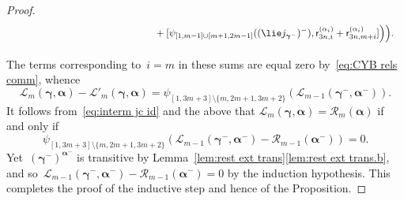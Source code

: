 \documentclass[12pt, reqno]{amsart}
\theoremstyle{definition}
\numberwithin{equation}{section}
\newcommand{\sr}[3]{\mathsf r_{#1,#2}^{(#3)}}
\begin{document}
\begin{proof}
\begin{align*}
&\phantom{=
\psi_{[1,3m+3]\setminus\{m,2m+1,3m+2\}}\Big(\sum_{1\le i\le m}}
+[\psi_{[1,m-1]\cup[m+1,2m-1]}((\lie j_{\boldsymbol\gamma^-})^-),\sr{3n}{i}{\alpha_i}+
\sr{3n}{m+i}{\alpha_i}]\Big)\Big).
\end{align*}
The terms corresponding to~$i=m$ in these sums are equal zero by~\eqref{eq:CYB rels comm}, whence 
$$
\mathscr L_m(\boldsymbol\gamma,\boldsymbol\alpha)-\mathscr L'_m(\boldsymbol\gamma,\boldsymbol\alpha)
=\psi_{[1,3m+3]\setminus\{m,2m+1,3m+2\}}(\mathscr L_{m-1}(\boldsymbol\gamma^-,\boldsymbol\alpha^-)).
$$
It follows from~\eqref{eq:interm jc id} and the above that $\mathscr L_m(\boldsymbol\gamma,\boldsymbol \alpha)=\mathscr R_m(\boldsymbol\alpha)$
if and only if 
$$
\psi_{[1,3m+3]\setminus\{m,2m+1,3m+2\}}(\mathscr L_{m-1}(\boldsymbol\gamma^-,\boldsymbol\alpha^-)-
\mathscr R_{m-1}(\boldsymbol{\alpha^-}))=0.
$$
Yet~$(\boldsymbol\gamma^-)^{\boldsymbol{\alpha}^-}$ is transitive by Lemma~\ref{lem:rest ext trans}\ref{lem:rest ext trans.b},
and so~$\mathscr L_{m-1}(\boldsymbol\gamma^-,\boldsymbol\alpha^-)-
\mathscr R_{m-1}(\boldsymbol{\alpha^-})=0$ by the induction hypothesis. This 
completes the proof of the inductive step and hence of the Proposition.
\end{proof}
\end{document}
